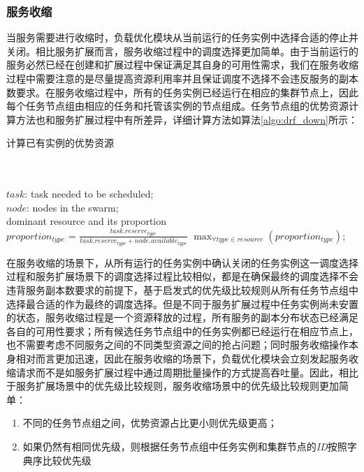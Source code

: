 \subsubsection{服务收缩}\label{sec:scalein}
当服务需要进行收缩时，负载优化模块从当前运行的任务实例中选择合适的停止并关闭。相比服务扩展而言，服务收缩过程中的调度选择更加简单。由于当前运行的服务必然已经在创建和扩展过程中保证满足其自身的可用性需求，我们在服务收缩过程中需要注意的是尽量提高资源利用率并且保证调度不选择不会违反服务的副本数要求。在服务收缩过程中，所有的任务实例已经运行在相应的集群节点上，因此每个任务节点组由相应的任务和托管该实例的节点组成。任务节点组的优势资源计算方法也和服务扩展过程中有所差异，详细计算方法如算法\ref{algo:drf_down}所示：
\begin{algorithm}[H]
\caption{计算已有实例的优势资源}
\label{algo:drf_down}
\begin{algorithmic}[0]
\\
\Require ~~\
\\
$task$: task needed to be scheduled;\\
$node$: nodes in the swarm;
\Ensure ~~\
\\
dominant resource and its proportion\\

        \State $proportion_{type}$ = $\frac{task.reserve_{type}}{task.reserve_{type}+node.available_{type}}$
    \EndFor
    \State \Return $\max_{\forall type \in resource} {(proportion_{type})}$;
\EndFunction
\end{algorithmic}
\end{algorithm}

在服务收缩的场景下，从所有运行的任务实例中确认关闭的任务实例这一调度选择过程和服务扩展场景下的调度选择过程比较相似，都是在确保最终的调度选择不会违背服务副本数要求的前提下，基于启发式的优先级比较规则从所有任务节点组中选择最合适的作为最终的调度选择。但是不同于服务扩展过程中任务实例尚未安置的状态，服务收缩过程是一个资源释放的过程，所有服务的副本分布状态已经满足各自的可用性要求；所有候选任务节点组中的任务实例都已经运行在相应节点上，也不需要考虑不同服务之间的不同类型资源之间的抢占问题；同时服务收缩操作本身相对而言更加迅速，因此在服务收缩的场景下，负载优化模块会立刻发起服务收缩请求而不是如服务扩展过程中通过周期批量操作的方式提高吞吐量。因此，相比于服务扩展场景中的优先级比较规则，服务收缩场景中的优先级比较规则更加简单：
\begin{enumerate}
\item 不同的任务节点组之间，优势资源占比更小则优先级更高；
\item 如果仍然有相同优先级，则根据任务节点组中任务实例和集群节点的\emph{ID}按照字典序比较优先级
\end{enumerate}

